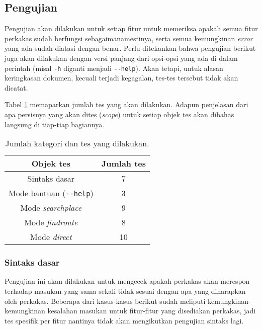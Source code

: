 \subsection{Pengujian}
\label{sec:testing-experiments-testing}

Pengujian akan dilakukan untuk setiap fitur untuk memeriksa apakah semua fitur perkakas sudah berfungsi sebagaimanamestinya, serta semua kemungkinan \textit{error} yang ada sudah diatasi dengan benar. Perlu ditekankan bahwa pengujian berikut juga akan dilakukan dengan versi panjang dari opsi-opsi yang ada di dalam perintah (misal \verb|-h| diganti menjadi \verb|--help|). Akan tetapi, untuk alasan keringkasan dokumen, kecuali terjadi kegagalan, tes-tes tersebut tidak akan dicatat.

Tabel \ref{tab:testing-experiments-testing-overview} memaparkan jumlah tes yang akan dilakukan. Adapun penjelasan dari apa persisnya yang akan dites (\textit{scope}) untuk setiap objek tes akan dibahas langsung di tiap-tiap bagiannya.

\begin{table}[H]
    \centering
    \begin{tabular}{|c|c|}
    \hline
        Objek tes & Jumlah tes \\
    \hline
        Sintaks dasar & 7 \\
    \hline
        Mode bantuan (\verb|--help|) & 3 \\
    \hline
        Mode \textit{searchplace} & 9 \\
    \hline
        Mode \textit{findroute} & 8 \\
    \hline
        Mode \textit{direct} & 10 \\
    \hline
	\end{tabular}
    \caption{Jumlah kategori dan tes yang dilakukan.}
    \label{tab:testing-experiments-testing-overview}
\end{table}

\subsubsection{Sintaks dasar}
\label{sec:testing-experiments-testing-basic}

Pengujian ini akan dilakukan untuk mengecek apakah perkakas akan merespon terhadap masukan yang sama sekali tidak sesuai dengan apa yang diharapkan oleh perkakas. Beberapa dari kasus-kasus berikut sudah meliputi kemungkinan-kemungkinan kesalahan masukan untuk fitur-fitur yang disediakan perkakas, jadi tes spesifik per fitur nantinya tidak akan mengikutkan pengujian sintaks lagi.

